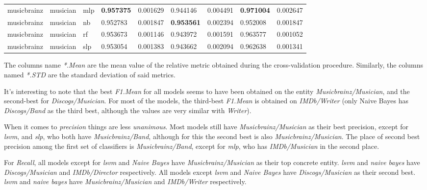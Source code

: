 \documentclass[epsfig,a4paper,11pt,titlepage,twoside,openany]{book}
\begin{document}
\begin{longtable}{|l|l|l|l|l|l|l|l|l|}
musicbrainz & musician & mlp   & \textbf{0.957375} & 0.001629 & 0.944146                           & 0.004491 & \textbf{0.971004} & 0.002647 \\
musicbrainz & musician & nb    & 0.952783                           & 0.001847 & \textbf{0.953561} & 0.002394 & 0.952008                           & 0.001847 \\
musicbrainz & musician & rf    & 0.953673                           & 0.001146 & 0.943972                           & 0.001591 & 0.963577                           & 0.001052 \\
musicbrainz & musician & slp   & 0.953054                           & 0.001383 & 0.943662                           & 0.002094 & 0.962638                           & 0.001341 \\ \hline
\end{longtable}


The columns name \textit{*.Mean} are the mean value of the relative metric obtained during the cross-validation procedure. Similarly, the columns named \textit{*.STD} are the standard deviation of said metrics. 

It's interesting to note that the best \textit{F1.Mean} for all models seems to have been obtained on the entity \textit{Musicbrainz/Musician}, and the second-best for \textit{Discogs/Musician}. For most of the models, the third-best \textit{F1.Mean} is obtained on \textit{IMDb/Writer} (only Naive Bayes has \textit{Discogs/Band} as the third best, although the values are very similar with \textit{Writer}).

When it comes to \textit{precision} things are less \textit{unanimous}. Most models still have \textit{Musicbrainz/Musician} as their best precision, except for \textit{lsvm}, and \textit{slp}, who both have \textit{Musicbrainz/Band}, although for this the second best is also \textit{Musicbrainz/Musician}. The place of second best precision among the first set of classifiers is \textit{Musicbrainz/Band}, except for \textit{mlp}, who has \textit{IMDb/Musician} in the second place. 

For \textit{Recall}, all models except for \textit{lsvm} and \textit{Naive Bayes} have \textit{Musicbrainz/Musician} as their top concrete entity. \textit{lsvm} and \textit{naive bayes} have \textit{Discogs/Musician} and \textit{IMDb/Director} respectively. All models except \textit{lsvm} and \textit{Naive Bayes} have \textit{Discogs/Musician} as their second best. \textit{lsvm} and \textit{naive bayes} have \textit{Musicbrainz/Musician} and \textit{IMDb/Writer} respectively.
\end{document}
